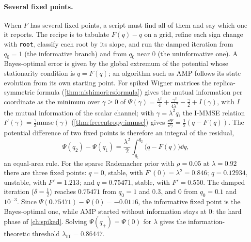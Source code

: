 \begin{refsection}
\paragraph{Several fixed points.} When $F$ has several fixed points, a script must find all of them and say which one it reports. The recipe is to tabulate $F(q)-q$ on a grid, refine each sign change with \texttt{root}, classify each root by its slope, and run the damped iteration from $q_0=1$ (the informative branch) and from $q_0$ near $0$ (the uninformative one). A Bayes-optimal error is given by the global extremum of the potential whose stationarity condition is $q=F(q)$; an algorithm such as AMP follows its state evolution from its own starting point. For spiked Wigner matrices the replica-symmetric formula (\cref{thm:nishimori:rsformula}) gives the mutual information per coordinate as the minimum over $\gamma\ge0$ of $\Psi(\gamma)=\frac{\lambda^2}4+\frac{\gamma^2}{4\lambda^2}-\frac\gamma2+I(\gamma)$, with $I$ the mutual information of the scalar channel; with $\gamma=\lambda^2q$, the I-MMSE relation $I'(\gamma)=\frac12\mathrm{mmse}(\gamma)$ (\cref{thm:freeentropy:immse}) gives $\frac{\dd\Psi}{\dd\gamma}=\frac12(q-F(q))$. The potential difference of two fixed points is therefore an integral of the residual,
\[
\Psi(q_2)-\Psi(q_1)=\frac{\lambda^2}2\int_{q_1}^{q_2}\bigl(q-F(q)\bigr)\dd q,
\]
an equal-area rule. For the sparse Rademacher prior with $\rho=0.05$ at $\lambda=0.92$ there are three fixed points: $q=0$, stable, with $F'(0)=\lambda^2=0.846$; $q=0.12934$, unstable, with $F'=1.213$; and $q=0.75471$, stable, with $F'=0.550$. The damped iteration ($\delta=\frac12$) reaches $0.75471$ from $q_0=1$ and $0.3$, and $0$ from $q_0=0.1$ and $10^{-3}$. Since $\Psi(0.75471)-\Psi(0)=-0.0116$, the informative fixed point is the Bayes-optimal one, while AMP started without information stays at $0$: the hard phase of \cref{ch:spiked}. Solving $\Psi(q_+)=\Psi(0)$ for $\lambda$ gives the information-theoretic threshold $\lambda_{\mathrm{IT}}=0.86447$.


\end{refsection}
